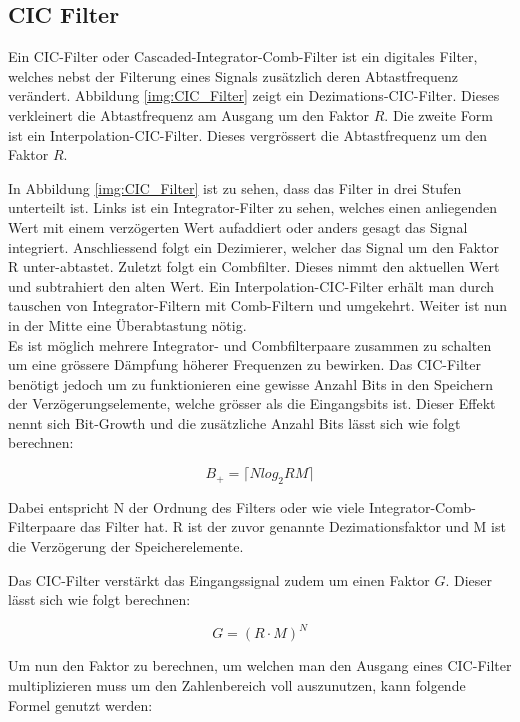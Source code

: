 \subsection{CIC Filter}\label{subsec:CIC_Filter}

Ein CIC-Filter oder Cascaded-Integrator-Comb-Filter ist ein digitales Filter, welches nebst der Filterung eines Signals zusätzlich deren Abtastfrequenz verändert. Abbildung \ref{img:CIC_Filter} zeigt ein Dezimations-CIC-Filter. Dieses verkleinert die Abtastfrequenz am Ausgang um den Faktor \(R\). Die zweite Form ist ein Interpolation-CIC-Filter. Dieses vergrössert die Abtastfrequenz um den Faktor \(R\).

In Abbildung \ref{img:CIC_Filter} ist zu sehen, dass das Filter in drei Stufen unterteilt ist. Links ist ein Integrator-Filter zu sehen, welches einen anliegenden Wert mit einem verzögerten Wert aufaddiert oder anders gesagt das Signal integriert. Anschliessend folgt ein Dezimierer, welcher das Signal um den Faktor R unter-abtastet. Zuletzt folgt ein Combfilter. Dieses nimmt den aktuellen Wert und subtrahiert den alten Wert. Ein Interpolation-CIC-Filter erhält man durch tauschen von Integrator-Filtern mit Comb-Filtern und umgekehrt. Weiter ist nun in der Mitte eine Überabtastung nötig.\\
Es ist möglich mehrere Integrator- und Combfilterpaare zusammen zu schalten um eine grössere Dämpfung höherer Frequenzen zu bewirken. Das CIC-Filter benötigt jedoch um zu funktionieren eine gewisse Anzahl Bits in den Speichern der Verzögerungselemente, welche grösser als die Eingangsbits ist. Dieser Effekt nennt sich Bit-Growth und die zusätzliche Anzahl Bits lässt sich wie folgt berechnen\cite{cic_a}\cite{cic_b}:

\begin{equation}
B_+ = \big \lceil Nlog_2RM \big \rceil
\label{equ:cic_bitgrowth}
\end{equation}

Dabei entspricht N der Ordnung des Filters oder wie viele Integrator-Comb-Filterpaare das Filter hat. R ist der zuvor genannte Dezimationsfaktor und M ist die Verzögerung der Speicherelemente.

Das CIC-Filter verstärkt das Eingangssignal zudem um einen Faktor \(G\). Dieser lässt sich wie folgt berechnen:

 \begin{equation}
 G = (R\cdot M)^N
 \label{equ:cic_gain}
 \end{equation}
 
Um nun den Faktor zu berechnen, um welchen man den Ausgang eines CIC-Filter multiplizieren muss um den Zahlenbereich voll auszunutzen, kann folgende Formel genutzt werden:

